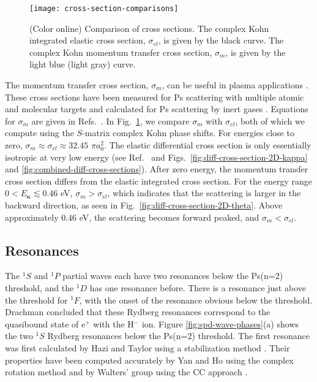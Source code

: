 \documentclass[preprint,showpacs,showkeys,preprintnumbers,amsmath,amssymb,longbibliography,pra,aps]{revtex4-1}
\begin{document}
{\begin{figure}[H]
	\centering
	\texttt{[image: cross-section-comparisons]}
	\caption{(Color online) Comparison of cross sections. The complex Kohn integrated
elastic cross section, $\sigma_{el}$, is given by the black curve. The complex
Kohn momentum transfer cross section, $\sigma_m$, is given by the
light blue (light gray) curve.} %
	\label{fig:cross-section-comparisons}
\end{figure}

The momentum transfer cross section, $\sigma_m$, can be useful in plasma applications
\cite{Wang2014, McEachran2014}. These cross sections have been measured for Ps
scattering with multiple atomic and molecular targets
\cite{Nagashima1998,Saito2003,Skalsey1998} and calculated
for Ps scattering by inert gases \cite{Blackwood2002c}. 
Equations for $\sigma_m$ are given
in Refs.~\cite{Bransden2003,Massey1969}.
In Fig.~\ref{fig:cross-section-comparisons}, we compare $\sigma_m$ with
$\sigma_{el}$, both of which we compute using the $S$-matrix complex Kohn phase shifts.
For energies close to zero,
$\sigma_m \approx \sigma_{el} \approx 32.45$ $\pi a_0^2$.
The elastic differential cross section is only essentially isotropic at
very low energy (see Ref.~\cite{Blackwood2002c} and
Figs.~\ref{fig:diff-cross-section-2D-kappa} and \ref{fig:combined-diff-cross-sections}).
After zero energy, the momentum transfer cross section differs from the
elastic integrated cross section. For the energy range
$0 < E_{\bm \kappa} \lesssim 0.46$ eV, $\sigma_m > \sigma_{el}$,
which indicates that the scattering is larger in the backward 
direction, as seen in Fig.~\ref{fig:diff-cross-section-2D-theta}.
Above approximately 0.46 eV, the scattering
becomes forward peaked, and $\sigma_m < \sigma_{el}$. %


\subsection{Resonances}
\label{sec:Resonances}

The $^1S$ and $^1P$ partial waves each have two resonances below the Ps(n=2) 
threshold, and the $^1D$ has one resonance before. There is a resonance just 
above the threshold for $^1F$, with the onset of the resonance obvious below the 
threshold. Drachman \cite{Drachman1979} concluded that these Rydberg 
resonances correspond to the quasibound state of e$^+$ with the H$^-$ ion.
Figure \ref{fig:spd-wave-phases}(a) shows the 
two $^1S$ Rydberg resonances below the Ps(n=2) threshold. The first resonance 
 was first 
calculated by Hazi and Taylor using a stabilization method \cite{Hazi1970}. 
Their properties have been computed accurately by Yan and Ho using the complex 
rotation method \cite{Yan1999} and by Walters' group using the CC 
approach \cite{Walters2004}.

}
\end{document}

